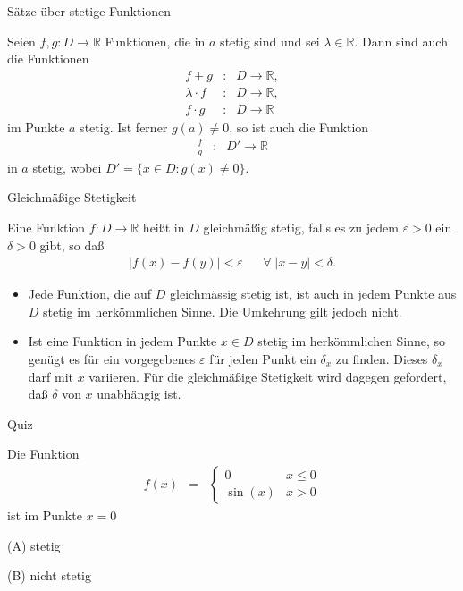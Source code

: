 \documentclass[german]{beamer}
\newcommand{\bq}{\begin{eqnarray*}}
\newcommand{\eq}{\end{eqnarray*}}
\newcommand{\eps}{\varepsilon}
\begin{document}
\begin{frame}{S\"atze \"uber stetige Funktionen}

\begin{theorem}
Seien $f,g: D \rightarrow {\mathbb R}$ Funktionen, die in $a$ stetig sind 
und sei $\lambda \in {\mathbb R}$.
Dann sind auch die Funktionen
\bq
 f+g & : & D \rightarrow {\mathbb R},
 \nonumber \\
 \lambda \cdot f & : & D \rightarrow {\mathbb R},
 \nonumber \\
 f \cdot g & : & D \rightarrow {\mathbb R}
\eq
im Punkte $a$ stetig. Ist ferner $g(a)\neq0$, so ist auch die Funktion
\bq
 \frac{f}{g} & : & D' \rightarrow {\mathbb R}
\eq
in $a$ stetig, wobei $D'=\{x\in D: g(x) \neq 0 \}$.
\end{theorem}

\end{frame}

\begin{frame}{Gleichm\"a{\ss}ige Stetigkeit}

\begin{definition}
Eine Funktion $f:D\rightarrow \mathbb R$ hei{\ss}t in $D$ gleichm\"a{\ss}ig stetig,
falls es zu jedem $\eps>0$ ein $\delta>0$ gibt, so da{\ss}
\bq
 \left| f(x) - f(y) \right| < \eps
 & & \forall \; \left| x-y \right| < \delta.
\eq
\end{definition}

\begin{itemize}
\item Jede Funktion, die auf $D$ gleichm\"assig stetig ist, ist auch in jedem Punkte aus $D$ stetig im
herk\"ommlichen Sinne. Die Umkehrung gilt jedoch nicht.

\item Ist eine Funktion in jedem Punkte $x \in D$ stetig im herk\"ommlichen Sinne, 
so gen\"ugt es f\"ur ein vorgegebenes $\eps$
f\"ur jeden Punkt ein $\delta_x$ zu finden. Dieses $\delta_x$ darf mit $x$ variieren.
F\"ur die gleichm\"a{\ss}ige Stetigkeit wird dagegen gefordert, da{\ss} $\delta$ von $x$ 
unabh\"angig ist.

\end{itemize}

\end{frame}

\begin{frame}{Quiz}

Die Funktion
\bq
 f(x) & = & \left\{\begin{array}{ll} 0 & x \le 0 \\ \sin(x) & x>0 \end{array} \right.
\eq
ist im Punkte $x=0$
\begin{description}
\item{(A)} stetig
\item{(B)} nicht stetig
\end{description}

\end{frame}
\end{document}
